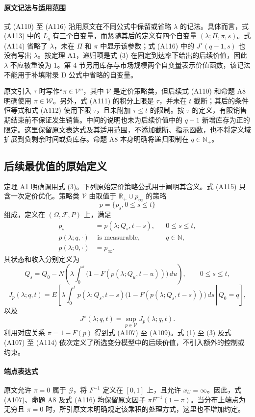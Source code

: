 \documentclass{article}
\begin{document}
\paragraph{原文记法与适用范围}
式 (A110) 至 (A116) 沿用原文在不同公式中保留或省略 $\lambda$ 的记法。具体而言，式 (A113) 中的 $L_q$ 有三个自变量，而紧随其后的定义有四个自变量 $(\lambda;\Pi,\pi,s)$。式 (A114) 省略了 $\lambda$，未在 $\Pi$ 和 $\pi$ 中显示该参数；式 (A116) 中的 $J^\star(q-1,s)$ 也没有写出 $\lambda$。按定理 A1，递归项是式 (3) 在固定到达率下给出的后续价值，因此 $\lambda$ 不应被重设为 1。第 4 节另用库存与市场规模两个自变量表示价值函数，该记法不能用于补填附录 D 公式中省略的自变量。

原文引入 $\tau$ 时写作“$\pi\in\mathcal V$”，其中 $\mathcal V$ 是定价策略类，但后续式 (A110) 和命题 A8 明确使用 $\pi\in\mathcal W$。另外，式 (A111) 的积分上限是 $\tau$，并未在 $t$ 截断；其后的条件恒等式和式 (A112) 使用下限 $\tau$，且未附加 $\tau\leq t$ 的限制。按 $\tau$ 的定义，有限销售期结束前不保证发生销售。中间的说明也未为后续价值中的 $q-1$ 新增库存为正的限定。这里保留原文表达式及其适用范围，不添加截断、指示函数，也不将定义域扩展到负剩余时间或负库存。命题 A8 本身明确将递归限制在 $q\in\mathbb N_+$。

\subsection*{后续最优值的原始定义}
定理 A1 明确调用式 (3)。下列原始定价策略公式用于阐明其含义。式 (A115) 只含一次定价优化。策略类 $\mathcal V$ 由取值于 $\mathbb R_+\cup p_\infty$ 的策略
\[
p=\{p_s,0\leq s\leq t\}
\]
组成，定义在 $(\Omega,\mathcal F,P)$ 上，满足
\[
\begin{aligned}
p_s&=p(\lambda;Q_s,t-s),&&0\leq s\leq t,\\
p(\lambda;q,\cdot)&\text{ is measurable},&&q\in\mathbb N,\\
p(\lambda;0,\cdot)&=p_\infty.
\end{aligned}
\]
其状态和收入分别定义为
\begin{equation}
Q_s=Q_0-N\left(\lambda\int_0^s
\bigl(1-F(p(\lambda;Q_u,t-u))\bigr)\,du\right),
\qquad 0\leq s\leq t,
\tag{2}
\end{equation}
\begin{equation}
J_p(\lambda;q,t)
=E\left[\left.\lambda\int_0^t
p(\lambda;Q_s,t-s)
\bigl(1-F(p(\lambda;Q_s,t-s))\bigr)\,ds
\,\right|\,Q_0=q\right],
\tag{1}
\end{equation}
以及
\begin{equation}
J^\star(\lambda;q,t)=\sup_{p\in\mathcal V}J_p(\lambda;q,t).
\tag{3}
\end{equation}
利用对应关系 $\pi=1-F(p)$ 得到式 (A107) 至 (A109)。式 (1) 至 (3) 及式 (A107) 至 (A114) 依次定义了所选变分模型中的后续价值，不引入额外的控制或约束。

\paragraph{端点表达式}
原文允许 $\pi=0$ 属于 $\mathcal G$，将 $F^{-1}$ 定义在 $[0,1]$ 上，且允许 $x_U=\infty$。因此，式 (A107)、命题 A8 及式 (A116) 均保留原文因子 $\pi F^{-1}(1-\pi)$。当分布上端点为无穷且 $\pi=0$ 时，所引原文未明确规定该乘积的处理方式，这里也不增加约定。
\end{document}
